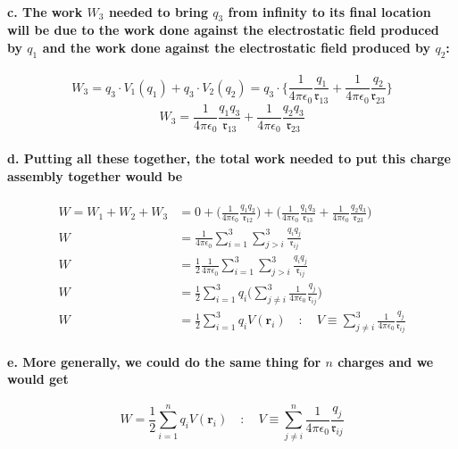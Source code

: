 \documentclass{article}
\begin{document}
\paragraph{\indent c. The work $W_3$ needed to bring $q_3$ from infinity to its final location will be due to the work done against the electrostatic field produced by $q_1$ and the work done against the electrostatic field produced by $q_2$:}
\begin{equation*}
    W_3=q_3\cdot V_1(q_1)+q_3\cdot V_2(q_2)=q_3\cdot \bigg\{ \frac{1}{4\pi\epsilon_0}\frac{q_1}{\mathfrak{r}_{13}} +\frac{1}{4\pi\epsilon_0}\frac{q_2}{\mathfrak{r}_{23}}\bigg\}
\end{equation*}
\begin{equation*}
    W_3=\frac{1}{4\pi\epsilon_0}\frac{q_1q_3}{\mathfrak{r}_{13}}+\frac{1}{4\pi\epsilon_0}\frac{q_2q_3}{\mathfrak{r}_{23}}
\end{equation*}
\paragraph{\indent d. Putting all these together, the total work needed to put this charge assembly together would be}
\begin{align*}
    W=W_1+W_2+W_3&=0+\bigg(\frac{1}{4\pi\epsilon_0}\frac{q_1q_2}{\mathfrak{r}_{12}}\bigg)+\bigg(\frac{1}{4\pi\epsilon_0}\frac{q_1q_3}{\mathfrak{r}_{13}}+\frac{1}{4\pi\epsilon_0}\frac{q_2q_3}{\mathfrak{r}_{23}}\bigg)\\
    W&=\frac{1}{4\pi\epsilon_0}\sum_{i=1}^3\sum_{j>i}^3\frac{q_iq_j}{\mathfrak{r}_{ij}}\\
    W&=\frac{1}{2}\frac{1}{4\pi\epsilon_0}\sum_{i=1}^3\sum_{j>i}^3\frac{q_iq_j}{\mathfrak{r}_{ij}}\\
    W&=\frac{1}{2}\sum_{i=1}^3q_i\bigg( \sum_{j\neq i}^3\frac{1}{4\pi \epsilon_0}\frac{q_j}{\mathfrak{r}_{ij}}\bigg)\\
     W&=\frac{1}{2}\sum_{i=1}^3q_iV(\boldsymbol{r}_i) \quad : \quad V\equiv \sum_{j\neq i}^{3}\frac{1}{4\pi\epsilon_0}\frac{q_j}{\mathfrak{r}_{ij}}
\end{align*}
\paragraph{\indent e. More generally, we could do the same thing for $n$ charges and we would get}
\begin{equation*}
    W=\frac{1}{2}\sum_{i=1}^n q_i V(\boldsymbol{r}_i) \quad :\quad V\equiv\sum_{j\neq i}^n \frac{1}{4\pi\epsilon_0}\frac{q_j}{\mathfrak{r}_{ij}}
\end{equation*}
\end{document}
